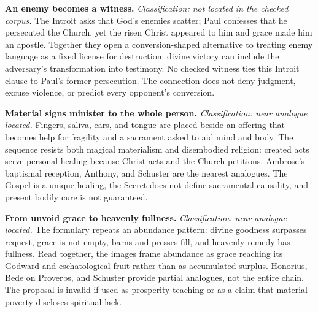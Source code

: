 \noindent\textbf{An enemy becomes a witness.\enspace{}}
\emph{Classification: not located in the checked corpus.} The Introit asks
that God's enemies scatter; Paul confesses that he persecuted the Church, yet
the risen Christ appeared to him and grace made him an apostle. Together they
open a conversion-shaped alternative to treating enemy language as a fixed
license for destruction: divine victory can include the adversary's
transformation into testimony. No checked witness ties this Introit clause to
Paul's former persecution. The connection does not deny judgment, excuse
violence, or predict every opponent's conversion.

\noindent\textbf{Material signs minister to the whole person.\enspace{}}
\emph{Classification: near analogue located.} Fingers, saliva, ears, and
tongue are placed beside an offering that becomes help for fragility and a
sacrament asked to aid mind and body. The sequence resists both magical
materialism and disembodied religion: created acts serve personal healing
because Christ acts and the Church petitions. Ambrose's baptismal reception,
Anthony, and Schuster are the nearest analogues. The Gospel is a unique
healing, the Secret does not define sacramental causality, and present bodily
cure is not guaranteed.

\noindent\textbf{From unvoid grace to heavenly fullness.\enspace{}}
\emph{Classification: near analogue located.} The formulary repeats an
abundance pattern: divine goodness surpasses request, grace is not empty,
barns and presses fill, and heavenly remedy has fullness. Read together, the
images frame abundance as grace reaching its Godward and eschatological fruit
rather than as accumulated surplus. Honorius, Bede on Proverbs, and Schuster
provide partial analogues, not the entire chain. The proposal is invalid if
used as prosperity teaching or as a claim that material poverty discloses
spiritual lack.

